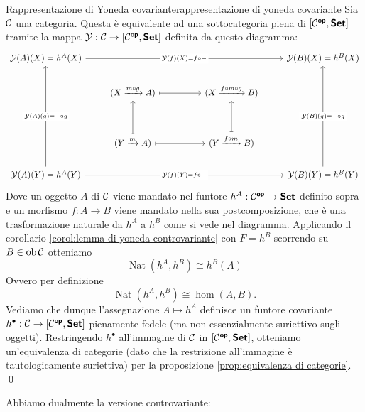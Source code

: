 \documentclass[openany]{book}
\renewcommand\C{\mc{C}}
\newcommand\nat{\operatorname{Nat}}
\begin{document}
\begin{theorem}{Rappresentazione di Yoneda covariante}{rappresentazione di yoneda covariante}
    Sia $\C$ una categoria. Questa è equivalente ad una sottocategoria piena di $[\C^\op, \setcat]$ tramite la mappa $\mc{Y} : \C \to [\C^\op, \setcat]$ definita da questo diagramma:
    \[\begin{tikzcd}
    	{\mc{Y}(A)(X) = h^A(X)} &&&& {\mc{Y}(B)(X) = h^B(X)} \\
    	& {(X \xrightarrow{m\circ g} A)} && {(X \xrightarrow{f\circ m\circ g} B)} \\
    	\\
    	& {(Y \xrightarrow{m} A)} && {(Y \xrightarrow{f\circ m} B)} \\
    	{\mc{Y}(A)(Y) = h^A(Y)} &&&& {\mc{Y}(B)(Y) = h^B(Y)}
    	\arrow["{\mc{Y}(f)(X) = f\circ -}"{description}, from=1-1, to=1-5]
    	\arrow[maps to, from=2-2, to=2-4]
    	\arrow[maps to, from=4-2, to=2-2]
    	\arrow[maps to, from=4-2, to=4-4]
    	\arrow[maps to, from=4-4, to=2-4]
    	\arrow["{\mc{Y}(A)(g) = -\circ g}"{description}, from=5-1, to=1-1]
    	\arrow["{\mc{Y}(f)(Y) = f\circ -}"{description}, from=5-1, to=5-5]
	    \arrow["{\mc{Y}(B)(g) = -\circ g}"{description}, from=5-5, to=1-5]
    \end{tikzcd}\]
    Dove un oggetto $A$ di $\C$ viene mandato nel funtore $h^A : \C^\op \to \setcat$ definito sopra e un morfismo $f:A\to B$ viene mandato nella sua postcomposizione, che è una trasformazione naturale da $h^A$ a $h^B$ come si vede nel diagramma.
    \proof
    Applicando il corollario \cref{corol:lemma di yoneda controvariante} con $F = h^B$ scorrendo su $B \in \ob\C$ otteniamo
    \[\nat(h^A, h^B) \cong h^B(A)\] 
    Ovvero per definizione
    \[\nat(h^A, h^B)\cong \hom(A,B).\]
    Vediamo che dunque l'assegnazione $A\mapsto h^A$ definisce un funtore covariante $h^\bullet : \C\to [\C^\op,\setcat]$ pienamente fedele (ma non essenzialmente suriettivo sugli oggetti). Restringendo $h^\bullet$ all'immagine di $\C$ in $[\C^\op,\setcat]$, otteniamo un'equivalenza di categorie (dato che la restrizione all'immagine è tautologicamente suriettiva) per la proposizione \cref{prop:equivalenza di categorie}.
    \qed
\end{theorem}

Abbiamo dualmente la versione controvariante:
\end{document}
